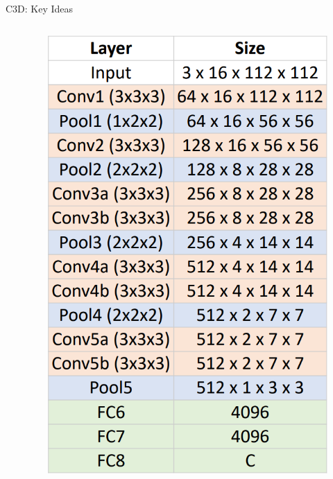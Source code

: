 \begin{frame}[allowframebreaks]{C3D: Key Ideas}
\begin{columns}[T,onlytextwidth]
\begin{column}{0.6\textwidth}
\begin{itemize}
\begin{itemize}
                \end{itemize}
            \end{itemize}
        \end{column}
        \begin{column}{0.35\textwidth}
            \begin{figure}
                \centering
                \includegraphics[width=\linewidth,keepaspectratio]{images/video/slide_19_1_img.png}
            \end{figure}
        \end{column}
    \end{columns}
\framebreak
    \begin{figure}
        \centering

\end{figure}
\end{frame}
